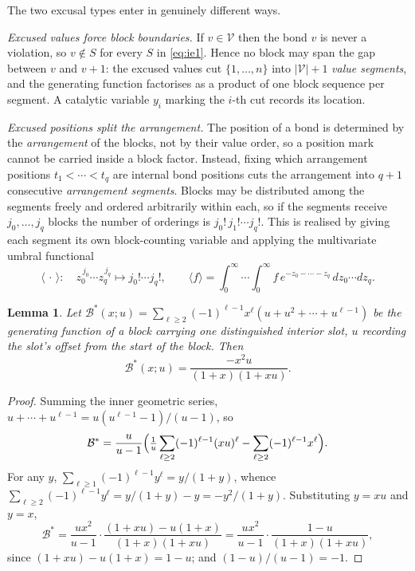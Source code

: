 \documentclass[11pt]{article}
\newtheorem{lemma}[theorem]{Lemma}
\theoremstyle{definition}
\begin{document}
The two excusal types enter in genuinely different ways.

\emph{Excused values force block boundaries.} If $v\in\mathcal V$ then the bond
$v$ is never a violation, so $v\notin S$ for every $S$ in \eqref{eq:ie1}. Hence
no block may span the gap between $v$ and $v+1$: the excused values cut
$\{1,\dots,n\}$ into $|\mathcal V|+1$ \emph{value segments}, and the generating
function factorises as a product of one block sequence per segment. A catalytic
variable $y_i$ marking the $i$-th cut records its location.

\emph{Excused positions split the arrangement.} The position of a bond is
determined by the \emph{arrangement} of the blocks, not by their value order,
so a position mark cannot be carried inside a block factor. Instead, fixing
which arrangement positions $t_1<\cdots<t_q$ are internal bond positions cuts
the arrangement into $q+1$ consecutive \emph{arrangement segments}. Blocks may
be distributed among the segments freely and ordered arbitrarily within each,
so if the segments receive $j_0,\dots,j_q$ blocks the number of orderings is
$j_0!\,j_1!\cdots j_q!$. This is realised by giving each segment its own
block-counting variable and applying the multivariate umbral functional
\begin{equation}\label{eq:umbral}
  \bigl\langle\,\cdot\,\bigr\rangle:\quad
  z_0^{\,j_0}\cdots z_q^{\,j_q}\longmapsto j_0!\cdots j_q!,
  \qquad
  \langle f\rangle=\int_0^\infty\!\!\cdots\!\int_0^\infty
  f\,e^{-z_0-\cdots-z_q}\,dz_0\cdots dz_q.
\end{equation}

\begin{lemma}\label{lem:marked}
Let $\mathcal B^{\ast}(x;u)=\sum_{\ell\ge2}(-1)^{\ell-1}x^{\ell}
(u+u^{2}+\cdots+u^{\ell-1})$ be the generating function of a block carrying one
distinguished interior slot, $u$ recording the slot's offset from the start of
the block. Then
\[
  \mathcal B^{\ast}(x;u)=\frac{-x^{2}u}{(1+x)(1+xu)}.
\]
\end{lemma}

\begin{proof}
Summing the inner geometric series,
$u+\cdots+u^{\ell-1}=u(u^{\ell-1}-1)/(u-1)$, so
\[
  \mathcal B^{\ast}
  =\frac{u}{u-1}\Bigl(\tfrac1u\sum_{\ell\ge2}(-1)^{\ell-1}(xu)^{\ell}
   -\sum_{\ell\ge2}(-1)^{\ell-1}x^{\ell}\Bigr).
\]
For any $y$, $\sum_{\ell\ge1}(-1)^{\ell-1}y^{\ell}=y/(1+y)$, whence
$\sum_{\ell\ge2}(-1)^{\ell-1}y^{\ell}=y/(1+y)-y=-y^{2}/(1+y)$. Substituting
$y=xu$ and $y=x$,
\[
  \mathcal B^{\ast}
  =\frac{ux^{2}}{u-1}\cdot\frac{(1+xu)-u(1+x)}{(1+x)(1+xu)}
  =\frac{ux^{2}}{u-1}\cdot\frac{1-u}{(1+x)(1+xu)},
\]
since $(1+xu)-u(1+x)=1-u$; and $(1-u)/(u-1)=-1$.
\end{proof}
\end{document}
